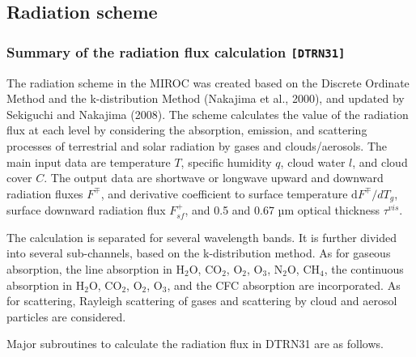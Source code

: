 \hypertarget{radiation-scheme}{%
\subsection{Radiation scheme}\label{radiation-scheme}}

\hypertarget{summary-of-the-radiation-flux-calculation-dtrn31}{%
\subsubsection{\texorpdfstring{Summary of the radiation flux calculation
\texttt{{[}DTRN31{]}}}{Summary of the radiation flux calculation {[}DTRN31{]}}}\label{summary-of-the-radiation-flux-calculation-dtrn31}}

The radiation scheme in the MIROC was created based on the Discrete
Ordinate Method and the k-distribution Method (Nakajima et al., 2000),
and updated by Sekiguchi and Nakajima (2008). The scheme calculates the
value of the radiation flux at each level by considering the absorption,
emission, and scattering processes of terrestrial and solar radiation by
gases and clouds/aerosols. The main input data are temperature \(T\),
specific humidity \(q\), cloud water \(l\), and cloud cover \(C\). The
output data are shortwave or longwave upward and downward radiation
fluxes \(F^{\mp}\), and derivative coefficient to surface temperature
\(\mathrm{d}F^{\mp}/dT_{g}\), surface downward radiation flux
\(F_{sf}^{+}\), and 0.5 and 0.67 µm optical thickness \(\tau^{vis}\).

The calculation is separated for several wavelength bands. It is further
divided into several sub-channels, based on the k-distribution method.
As for gaseous absorption, the line absorption in
\(\mathrm{H}_{2} \mathrm{O}\), \(\mathrm{C}\mathrm{O}_{2}\),
\(\mathrm{O}_{2}\), \(\mathrm{O}_{3}\), \(\mathrm{N}_{2} \mathrm{O}\),
\(\mathrm{C}\mathrm{H}_{4}\), the continuous absorption in
\(\mathrm{H}_{2} \mathrm{O}\), \(\mathrm{C}\mathrm{O}_{2}\),
\(\mathrm{O}_{2}\), \(\mathrm{O}_{3}\), and the CFC absorption are
incorporated. As for scattering, Rayleigh scattering of gases and
scattering by cloud and aerosol particles are considered.

Major subroutines to calculate the radiation flux in DTRN31 are as
follows.

